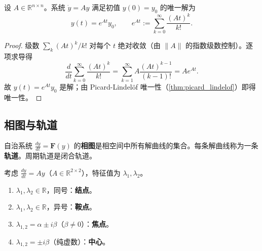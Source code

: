 \begin{theorem}[常系数线性系统的指数解]\label{thm:constant_coefficient_exponential}
设 $A \in \mathbb{R}^{n \times n}$。系统 $\dot{y} = A y$ 满足初值 $y(0) = y_0$ 的唯一解为
\[
y(t) = e^{At} y_0, \qquad e^{At} := \sum_{k=0}^{\infty} \frac{(At)^k}{k!}.
\]
\end{theorem}

\begin{proof}
级数 $\sum_k (At)^k/k!$ 对每个 $t$ 绝对收敛（由 $\|A\|$ 的指数级数控制）。逐项求导得
\[
\frac{d}{dt}\sum_{k=0}^{\infty}\frac{(At)^k}{k!} = \sum_{k=1}^{\infty} A \frac{(At)^{k-1}}{(k-1)!} = A e^{At}.
\]
故 $y(t) = e^{At}y_0$ 是解；由 Picard-Lindelöf 唯一性（\cref{thm:picard_lindelof}）即得唯一性。
\end{proof}

\subsection{相图与轨道}\label{sec:ode_phase}

\begin{definition}[相图与轨道]\label{def:phase_portrait}
自治系统 $\frac{dy}{dt} = \mathbf{F}(y)$ 的\textbf{相图}是相空间中所有解曲线的集合。每条解曲线称为一条\textbf{轨道}。周期轨道是闭合轨道。
\end{definition}

\begin{theorem}[常系数二维线性系统的相图分类]\label{thm:linear_phase_portrait}
考虑 $\frac{dy}{dt} = A y$（$A \in \mathbb{R}^{2 \times 2}$），特征值为 $\lambda_1, \lambda_2$。
\begin{enumerate}[label=(\roman*)]
    \item $\lambda_1, \lambda_2 \in \mathbb{R}$，同号：\textbf{结点}。
    \item $\lambda_1, \lambda_2 \in \mathbb{R}$，异号：\textbf{鞍点}。
    \item $\lambda_{1,2} = \alpha \pm i\beta$（$\beta \neq 0$）：\textbf{焦点}。
    \item $\lambda_{1,2} = \pm i\beta$（纯虚数）：\textbf{中心}。
\end{enumerate}
\end{theorem}

